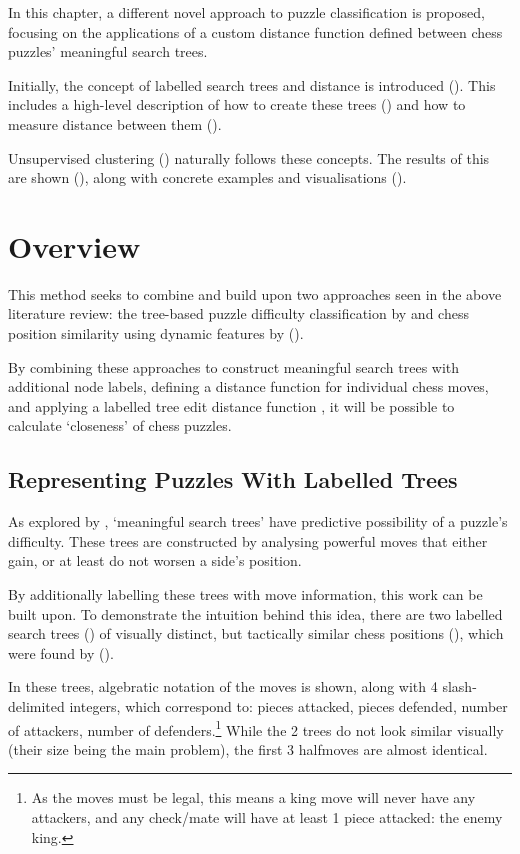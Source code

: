 In this chapter, a different novel approach to puzzle classification is
proposed, focusing on the applications of a custom distance function defined
between chess puzzles' meaningful search trees.

Initially, the concept of labelled search trees and distance is introduced
(). This includes a high-level description of how to create these
trees () and how to measure distance between them
().

Unsupervised clustering () naturally follows these concepts. The
results of this are shown (), along with concrete examples and
visualisations ().

\section{Overview}\label{treeS1}

This method seeks to combine and build upon two approaches seen in the above
literature review: the tree-based puzzle difficulty classification by
\citet{chessTrees} and chess position similarity using dynamic features by
\citet{chessMotifs} ().

By combining these approaches to construct meaningful search trees with
additional node labels, defining a distance function for individual chess
moves, and applying a labelled tree edit distance function
\citep{editDistTrees}, it will be possible to calculate `closeness' of chess
puzzles. 

\subsection{Representing Puzzles With Labelled Trees}\label{treeS11}

As explored by \citet{chessTrees}, `meaningful search trees' have predictive
possibility of a puzzle's difficulty. These trees are constructed by analysing
powerful moves that either gain, or at least do not worsen a side's position. 

By additionally labelling these trees with move information, this work can be
built upon. To demonstrate the intuition behind this idea, there are two
labelled search trees () of visually distinct, but tactically
similar chess positions (), which were found by
\citet{chessLanguage} (). 

In these trees, algebratic notation of the moves is shown, along with 4
slash-delimited integers, which correspond to: pieces attacked, pieces
defended, number of attackers, number of defenders.\footnote{As the moves must
be legal, this means a king move will never have any attackers, and any
check/mate will have at least 1 piece attacked: the enemy king.} While the 2
trees do not look similar visually (their size being the main problem), the
first 3 halfmoves are almost identical. 

